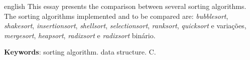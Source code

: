 \documentclass[
	article,			%
	11pt,				%
	oneside,			%
	a4paper,			%
	english,			%
	brazil,				%
	sumario=tradicional
	]{abntex2}
\begin{document}
\renewcommand{\resumoname}{Abstract}
\begin{resumoumacoluna}
 \begin{otherlanguage*}{english}
   This essay presents the comparison between several sorting algorithms. The sorting algorithms implemented and to be compared are: \emph{bubblesort}, \emph{shakesort}, \emph{insertionsort}, \emph{shellsort}, \emph{selectionsort}, \emph{ranksort}, \emph{quicksort} e variações, \emph{mergesort}, \emph{heapsort}, \emph{radixsort} e \emph{radixsort} binário.

   \vspace{\onelineskip}
 
   \noindent
   \textbf{Keywords}: sorting algorithm. data structure. C.
 \end{otherlanguage*}  
\end{resumoumacoluna}




%
%


\begin{apendicesenv}



\end{apendicesenv}

\begin{anexosenv}



\end{anexosenv}
\end{document}
